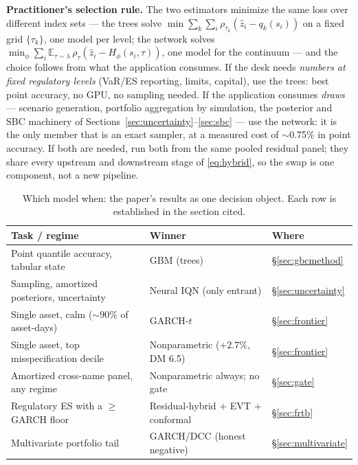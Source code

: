 \documentclass[11pt]{article}
\theoremstyle{remark}
\begin{document}
\noindent\textbf{Practitioner's selection rule.} The two estimators
minimize the same loss over different index sets --- the trees solve
$\min \sum_{k}\sum_{i}\rho_{\tau_k}(\widehat{z}_i - q_k(s_i))$ on a
fixed grid $\{\tau_k\}$, one model per level; the network solves
$\min_\phi \sum_i \mathbb{E}_{\tau\sim\lambda}\,
\rho_\tau(\widehat{z}_i - H_\phi(s_i,\tau))$, one model for the
continuum --- and the choice follows from what the application consumes.
If the desk needs \emph{numbers at fixed regulatory levels} (VaR/ES
reporting, limits, capital), use the trees: best point accuracy, no
GPU, no sampling needed. If the application consumes \emph{draws} ---
scenario generation, portfolio aggregation by simulation, the posterior
and SBC machinery of Sections~\ref{sec:uncertainty}--\ref{sec:sbc} ---
use the network: it is the only member that is an exact sampler, at a
measured cost of $\sim$0.75\% in point accuracy. If both are needed,
run both from the same pooled residual panel; they share every upstream
and downstream stage of \eqref{eq:hybrid}, so the swap is one component,
not a new pipeline.

\medskip\noindent{}

\begin{table}[t]
\centering\small
\caption{Which model when: the paper's results as one decision object.
Each row is established in the section cited.}
\label{tab:decision}
\begin{tabular}{p{}p{}l}
\toprule
Task / regime & Winner & Where \\
\midrule
Point quantile accuracy, tabular state & GBM (trees) & \S\ref{sec:gbcmethod} \\
Sampling, amortized posteriors, uncertainty & Neural IQN (only entrant) & \S\ref{sec:uncertainty} \\
Single asset, calm ($\sim$90\% of asset-days) & GARCH-$t$ & \S\ref{sec:frontier} \\
Single asset, top misspecification decile & Nonparametric ($+2.7\%$, DM 6.5) & \S\ref{sec:frontier} \\
Amortized cross-name panel, any regime & Nonparametric always; no gate & \S\ref{sec:gate} \\
Regulatory ES with a $\ge$GARCH floor & Residual-hybrid $+$ EVT $+$ conformal & \S\ref{sec:frtb} \\
Multivariate portfolio tail & GARCH/DCC (honest negative) & \S\ref{sec:multivariate} \\
\bottomrule
\end{tabular}
\end{table}
\end{document}
